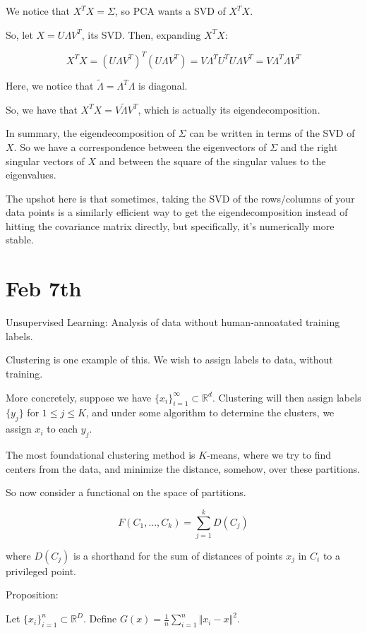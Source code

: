 \documentclass[10pt]{article}
\begin{document}
We notice that $X^T X = \Sigma$, so PCA wants a SVD of $X^T X$.

So, let $X = U \Lambda V^T$, its SVD. Then, expanding $X^T X$:

$$ X^T X = (U \Lambda V^T)^T (U \Lambda V^T) = V \Lambda^T U^T U \Lambda V^T  = V \Lambda ^T \Lambda V^T$$

Here, we notice that $\tilde{\Lambda} = \Lambda^T \Lambda$ is diagonal.

So, we have that $X^T X = V \tilde{\Lambda} V^T$, which is actually its eigendecomposition.

In summary, the eigendecomposition of $\Sigma$ can be written in terms of the SVD of $X$. So we have a correspondence between the eigenvectors of $\Sigma$ and the right singular vectors of $X$ and between the square of the singular values to the eigenvalues.

The upshot here is that sometimes, taking the SVD of the rows/columns of your data points is a similarly efficient way to get the eigendecomposition instead of hitting the covariance matrix directly, but specifically, it’s numerically more stable.

\section*{Feb 7th}

Unsupervised Learning: Analysis of data without human-annoatated training labels.

Clustering is one example of this. We wish to assign labels to data, without training.

More concretely, suppose we have $\{ x_i \}_{i=1}^\infty \subset \mathbb{R}^d$. Clustering will then assign labels $\{ y_j \}$ for $1 \leq j \leq K$, and under some algorithm to determine the clusters, we assign $x_i$ to each $y_j$.

The most foundational clustering method is $K$-means, where we try to find centers from the data, and minimize the distance, somehow, over these partitions.

So now consider a functional on the space of partitions. 

$$F(C_1,...,C_k) = \sum_{j=1}^k D(C_j)$$

where $D(C_j)$ is a shorthand for the sum of distances of points $x_j$ in $C_i$ to a privileged point.

Proposition:

Let $ \{ x_i \}_{i=1}^n \subset \mathbb{R}^D$. Define $G(x) = \frac{1}{n} \sum_{i=1}^n \Vert x_i - x \Vert^2$.
\end{document}
